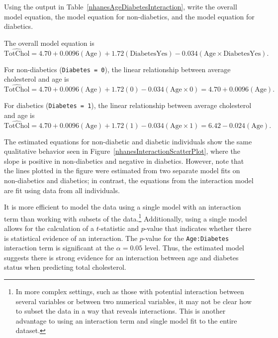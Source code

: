 \begin{example}{Using the output in Table~\ref{nhanesAgeDiabetesInteraction}, write the overall model equation, the model equation for non-diabetics, and the model equation for diabetics.}
	
	The overall model equation is 
	\[\widehat{\text{TotChol}} = 4.70 + 0.0096(\text{Age}) + 1.72(\text{DiabetesYes})
	- 0.034(\text{Age} \times \text{DiabetesYes}). \]
	
	For non-diabetics (\texttt{Diabetes = 0}), the linear relationship between average cholesterol and age is
	\[\widehat{\text{TotChol}} = 4.70 + 0.0096(\text{Age}) + 1.72(0)
	- 0.034(\text{Age} \times 0) = 4.70 + 0.0096(\text{Age}).\]
	
	For diabetics (\texttt{Diabetes = 1}), the linear relationship between average cholesterol and age is
	\[\widehat{\text{TotChol}} = 4.70 + 0.0096(\text{Age}) + 1.72(1)
	- 0.034(\text{Age} \times 1) = 6.42 - 0.024(\text{Age}). \]
\end{example}

The estimated equations for non-diabetic and diabetic individuals show the same qualitative behavior seen in Figure~\ref{nhanesInteractionScatterPlot}, where the slope is positive in non-diabetics and negative in diabetics. However, note that the lines plotted in the figure were estimated from two separate model fits on non-diabetics and diabetics; in contrast, the equations from the interaction model are fit using data from all individuals.

It is more efficient to model the data using a single model with an interaction term than working with subsets of the data.\footnote{In more complex settings, such as those with potential interaction between several variables or between two numerical variables, it may not be clear how to subset the data in a way that reveals interactions. This is another advantage to using an interaction term and single model fit to the entire dataset.} Additionally, using a single model allows for the calculation of a $t$-statistic and $p$-value that indicates whether there is statistical evidence of an interaction. The $p$-value for the \texttt{Age:Diabetes} interaction term is significant at the $\alpha = 0.05$ level. Thus, the estimated model suggests there is strong evidence for an interaction between age and diabetes status when predicting total cholesterol. 

